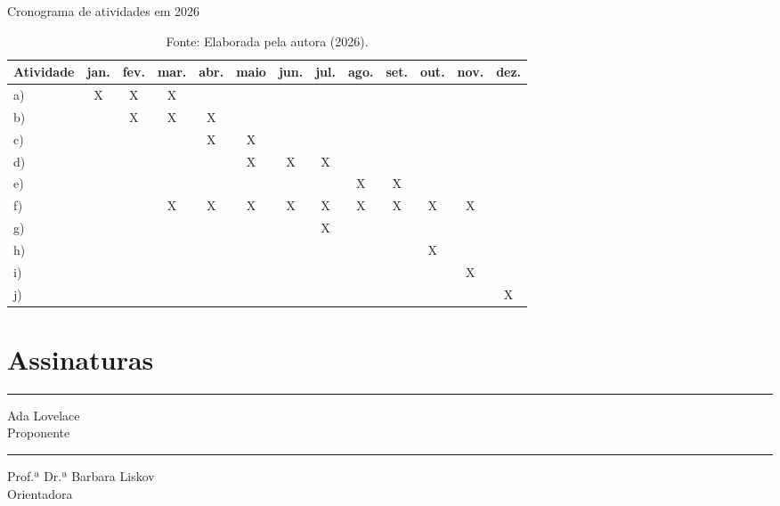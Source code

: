\documentclass[diss-proposta]{texufpel}
\begin{document}
\begin{table}[htbp]
  \caption{Cronograma de atividades em 2026}
  \label{tab:cronograma}
  \centering
  \setlength{\tabcolsep}{4pt}
  \begin{tabular}{l*{12}{c}}
    \hline
    Atividade & jan. & fev. & mar. & abr. & maio & jun. & jul. & ago. & set. & out. & nov. & dez. \\
    \hline
    a) & X & X & X &   &   &   &   &   &   &   &   &   \\
    b) &   & X & X & X &   &   &   &   &   &   &   &   \\
    c) &   &   &   & X & X &   &   &   &   &   &   &   \\
    d) &   &   &   &   & X & X & X &   &   &   &   &   \\
    e) &   &   &   &   &   &   &   & X & X &   &   &   \\
    f) &   &   & X & X & X & X & X & X & X & X & X &   \\
    g) &   &   &   &   &   &   & X &   &   &   &   &   \\
    h) &   &   &   &   &   &   &   &   &   & X &   &   \\
    i) &   &   &   &   &   &   &   &   &   &   & X &   \\
    j) &   &   &   &   &   &   &   &   &   &   &   & X \\
    \hline
  \end{tabular}
  \caption*{Fonte: Elaborada pela autora (2026).}
\end{table}




\chapter*{Assinaturas}

\vspace{2cm}

\begin{center}
\rule{8cm}{.3mm}

Ada Lovelace\\               %
Proponente
\end{center}

\vspace{3cm}

\begin{center}
\rule{8cm}{.3mm}

Prof.ª Dr.ª Barbara Liskov\\  %
Orientadora
\end{center}
\end{document}
